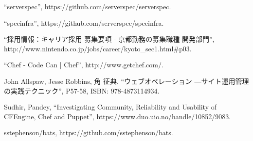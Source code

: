 \begin{thebibliography}{99}
``serverspec'', https://github.com/serverspec/serverspec.

``specinfra'', https://github.com/serverspec/specinfra.

``採用情報：キャリア採用 募集要項 - 京都勤務の募集職種 開発部門'',
http://www.nintendo.co.jp/jobs/career/kyoto\_sec1.html\#p03.

``Chef - Code Can | Chef'', http://www.getchef.com/.

John Allspaw, Jesse Robbins, 角 征典,
``ウェブオペレーション ―サイト運用管理の実践テクニック'',
P57-58, ISBN: 978-4873114934.

Sudhir, Pandey,
``Investigating Community, Reliability and Usability of CFEngine, Chef and Puppet'',
https://www.duo.uio.no/handle/10852/9083.

sstephenson/bats,
https://github.com/sstephenson/bats.

\end{thebibliography}
